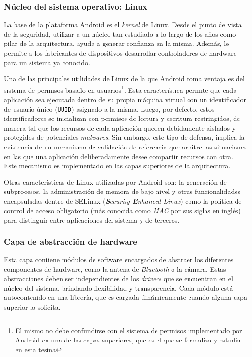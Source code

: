 \subsubsection*{Núcleo del sistema operativo: Linux}
\label{section:architecture:kernel}
La base de la plataforma Android es el \textit{kernel} de Linux. Desde el punto de vista de la
seguridad, utilizar a un núcleo tan estudiado a lo largo de los años como pilar de la arquitectura,
ayuda a generar confianza en la misma. Además, le permite a los fabricantes de dispositivos
desarrollar controladores de hardware para un sistema ya conocido.

Una de las principales utilidades de Linux de la que Android toma ventaja es del sistema de permisos
basado en usuarios\footnote{El mismo no debe confundirse con el sistema de permisos implementado por
    Android en una de las capas superiores, que es el que se formaliza y estudia en esta tesina}. Esta
característica permite que cada aplicación sea ejecutada dentro de su propia máquina virtual con un
identificador de usuario único (\texttt{UUID}) asignado a la misma. Luego, por defecto, estos
identificadores se inicializan con permisos de lectura y escritura restringidos, de manera tal que
los recursos de cada aplicación queden debidamente aislados y protegidos de potenciales
\textit{malwares}. Sin embargo, este tipo de defensa, implica la existencia de un mecanismo de
validación de referencia que arbitre las situaciones en las que una aplicación deliberadamente desee
compartir recursos con otra. Este mecanismo es implementado en las capas superiores de la
arquitectura.

Otras características de Linux utilizadas por Android son: la generación de subprocesos, la
administración de memora de bajo nivel y otras funcionalidades encapsuladas dentro de SELinux
(\textit{\textbf{S}ecurity \textbf{E}nhanced Linux}) como la política de control de acceso
obligatorio (más conocida como \textit{MAC} por sus siglas en inglés) para distinguir entre
aplicaciones del sistema y de terceros.

\subsubsection*{Capa de abstracción de hardware}
Esta capa contiene módulos de software encargados de abstraer los diferentes componentes de
hardware, como la antena de \textit{Bluetooth} o la cámara. Estas abstracciones deben ser
independientes de los \textit{drivers} que se encuentran en el núcleo del sistema, brindando
flexibilidad y transparencia. Cada módulo está autocontenido en una librería, que es cargada
dinámicamente cuando alguna capa superior lo solicita.

